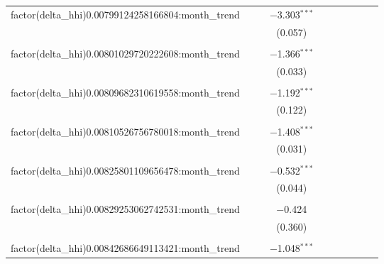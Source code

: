 \begin{table}[H]
{\begin{tabular}{@{\extracolsep{5pt}}lccccccccc}
  factor(delta\_hhi)0.00799124258166804:month\_trend &  &  & $-$3.303$^{***}$ &  &  &  &  &  &  \\  

   &  &  & (0.057) &  &  &  &  &  &  \\  

   & & & & & & & & & \\  

  factor(delta\_hhi)0.00801029720222608:month\_trend &  &  & $-$1.366$^{***}$ &  &  &  &  &  &  \\  

   &  &  & (0.033) &  &  &  &  &  &  \\  

   & & & & & & & & & \\  

  factor(delta\_hhi)0.00809682310619558:month\_trend &  &  & $-$1.192$^{***}$ &  &  &  &  &  &  \\  

   &  &  & (0.122) &  &  &  &  &  &  \\  

   & & & & & & & & & \\  

  factor(delta\_hhi)0.00810526756780018:month\_trend &  &  & $-$1.408$^{***}$ &  &  &  &  &  &  \\  

   &  &  & (0.031) &  &  &  &  &  &  \\  

   & & & & & & & & & \\  

  factor(delta\_hhi)0.00825801109656478:month\_trend &  &  & $-$0.532$^{***}$ &  &  &  &  &  &  \\  

   &  &  & (0.044) &  &  &  &  &  &  \\  

   & & & & & & & & & \\  

  factor(delta\_hhi)0.00829253062742531:month\_trend &  &  & $-$0.424 &  &  &  &  &  &  \\  

   &  &  & (0.360) &  &  &  &  &  &  \\  

   & & & & & & & & & \\  

  factor(delta\_hhi)0.00842686649113421:month\_trend &  &  & $-$1.048$^{***}$ &  &  &  &  &  &  \\  


\end{tabular}}
\end{table}
